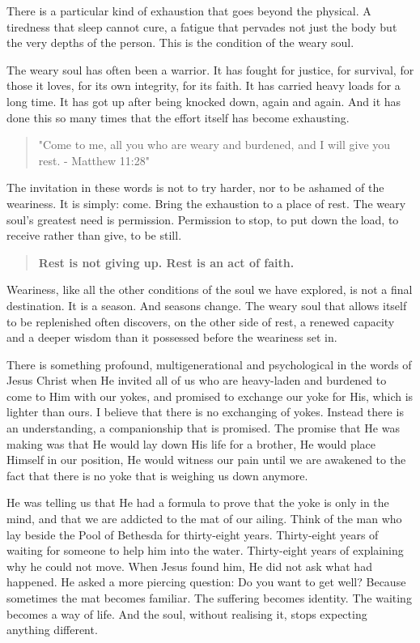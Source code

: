 There is a particular kind of exhaustion that goes beyond the physical.
A tiredness that sleep cannot cure, a fatigue that pervades not just the
body but the very depths of the person. This is the condition of the
weary soul.

The weary soul has often been a warrior. It has fought for justice, for
survival, for those it loves, for its own integrity, for its faith. It
has carried heavy loads for a long time. It has got up after being
knocked down, again and again. And it has done this so many times that
the effort itself has become exhausting.

\begin{quote}
"Come to me, all you who are weary and burdened, and I will give you
rest. - Matthew 11:28"
\end{quote}

The invitation in these words is not to try harder, nor to be ashamed of
the weariness. It is simply: come. Bring the exhaustion to a place of
rest. The weary soul's greatest need is permission. Permission to stop,
to put down the load, to receive rather than give, to be still.

\begin{quote}
\textbf{Rest is not giving up. Rest is an act of faith.}
\end{quote}

Weariness, like all the other conditions of the soul we have explored,
is not a final destination. It is a season. And seasons change. The
weary soul that allows itself to be replenished often discovers, on the
other side of rest, a renewed capacity and a deeper wisdom than it
possessed before the weariness set in.

There is something profound, multigenerational and psychological in the
words of Jesus Christ when He invited all of us who are heavy-laden and
burdened to come to Him with our yokes, and promised to exchange our
yoke for His, which is lighter than ours. I believe that there is no
exchanging of yokes. Instead there is an understanding, a companionship
that is promised. The promise that He was making was that He would lay
down His life for a brother, He would place Himself in our position, He
would witness our pain until we are awakened to the fact that there is
no yoke that is weighing us down anymore.

He was telling us that He had a formula to prove that the yoke is only
in the mind, and that we are addicted to the mat of our ailing. Think of
the man who lay beside the Pool of Bethesda for thirty-eight years.
Thirty-eight years of waiting for someone to help him into the water.
Thirty-eight years of explaining why he could not move. When Jesus found
him, He did not ask what had happened. He asked a more piercing
question: Do you want to get well? Because sometimes the mat becomes
familiar. The suffering becomes identity. The waiting becomes a way of
life. And the soul, without realising it, stops expecting anything
different.

